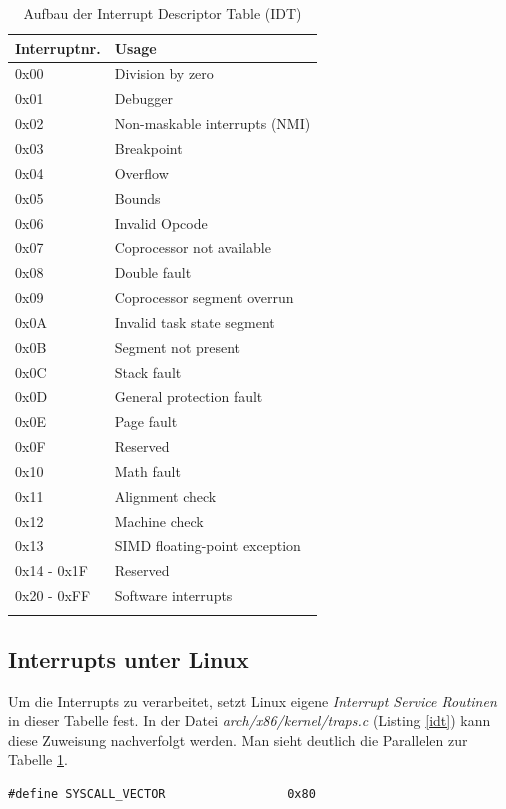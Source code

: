 \begin{longtable}{| l | l |} \hline
   \textbf{Interruptnr.} & \textbf{Usage} \\ \hline
   0x00 & Division by zero \\ \hline
   0x01 & Debugger \\ \hline
   0x02 & Non-maskable interrupts (NMI) \\ \hline
   0x03 & Breakpoint \\ \hline
   0x04 & Overflow \\ \hline
   0x05 & Bounds \\ \hline
   0x06 & Invalid Opcode \\ \hline
   0x07 & Coprocessor not available \\ \hline
   0x08 & Double fault \\ \hline
   0x09 & Coprocessor segment overrun \\ \hline
   0x0A & Invalid task state segment \\ \hline
   0x0B & Segment not present \\ \hline
   0x0C & Stack fault \\ \hline
   0x0D & General protection fault \\ \hline
   0x0E & Page fault \\ \hline
   0x0F & Reserved \\ \hline
   0x10 & Math fault \\ \hline
   0x11 & Alignment check \\ \hline
   0x12 & Machine check \\ \hline
   0x13 & SIMD floating-point exception \\ \hline
   0x14 - 0x1F & Reserved \\ \hline
   0x20 - 0xFF & Software interrupts \\ \hline
   \caption{Aufbau der Interrupt Descriptor Table (IDT)}
   \label{tab:idt_isr}
\end{longtable} 

\subsection{Interrupts unter Linux}

Um die Interrupts zu verarbeitet, setzt Linux eigene \emph{Interrupt Service Routinen} in dieser Tabelle fest. In der Datei
\emph{arch/x86/kernel/traps.c} (Listing \ref{idt}) kann diese Zuweisung nachverfolgt werden. Man sieht deutlich die Parallelen zur Tabelle \ref{tab:idt_isr}.
\begin{lstlisting}[caption=arch/x86/include/asm/irq\_vectors.h]
#define SYSCALL_VECTOR                 0x80
\end{lstlisting}

